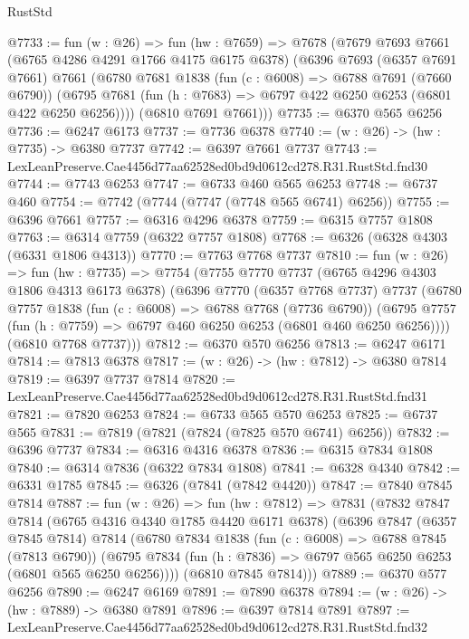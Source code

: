 \begin{lexlean}{RustStd}
\begin{coremodule}
@7733 := fun (w : @26) =>
  fun (hw : @7659) =>
  @7678
    (@7679
      @7693
      @7661
      (@6765 @4286 @4291 @1766 @4175 @6175 @6378)
      (@6396
        @7693
        (@6357 @7691 @7661)
        @7661
        (@6780
          @7681
          @1838
          (fun (c : @6008) => @6788 @7691 (@7660 @6790))
          (@6795 @7681 (fun (h : @7683) => @6797 @422 @6250 @6253 (@6801 @422 @6250 @6256))))
        (@6810 @7691 @7661)))
@7735 := @6370 @565 @6256
@7736 := @6247 @6173
@7737 := @7736 @6378
@7740 := (w : @26) -> (hw : @7735) -> @6380 @7737
@7742 := @6397 @7661 @7737
@7743 := LexLeanPreserve.Cae4456d77aa62528ed0bd9d0612cd278.R31.RustStd.fnd30
@7744 := @7743 @6253
@7747 := @6733 @460 @565 @6253
@7748 := @6737 @460
@7754 := @7742 (@7744 (@7747 (@7748 @565 @6741) @6256))
@7755 := @6396 @7661
@7757 := @6316 @4296 @6378
@7759 := @6315 @7757 @1808
@7763 := @6314 @7759 (@6322 @7757 @1808)
@7768 := @6326 (@6328 @4303 (@6331 @1806 @4313))
@7770 := @7763 @7768 @7737
@7810 := fun (w : @26) =>
  fun (hw : @7735) =>
  @7754
    (@7755
      @7770
      @7737
      (@6765 @4296 @4303 @1806 @4313 @6173 @6378)
      (@6396
        @7770
        (@6357 @7768 @7737)
        @7737
        (@6780
          @7757
          @1838
          (fun (c : @6008) => @6788 @7768 (@7736 @6790))
          (@6795 @7757 (fun (h : @7759) => @6797 @460 @6250 @6253 (@6801 @460 @6250 @6256))))
        (@6810 @7768 @7737)))
@7812 := @6370 @570 @6256
@7813 := @6247 @6171
@7814 := @7813 @6378
@7817 := (w : @26) -> (hw : @7812) -> @6380 @7814
@7819 := @6397 @7737 @7814
@7820 := LexLeanPreserve.Cae4456d77aa62528ed0bd9d0612cd278.R31.RustStd.fnd31
@7821 := @7820 @6253
@7824 := @6733 @565 @570 @6253
@7825 := @6737 @565
@7831 := @7819 (@7821 (@7824 (@7825 @570 @6741) @6256))
@7832 := @6396 @7737
@7834 := @6316 @4316 @6378
@7836 := @6315 @7834 @1808
@7840 := @6314 @7836 (@6322 @7834 @1808)
@7841 := @6328 @4340
@7842 := @6331 @1785
@7845 := @6326 (@7841 (@7842 @4420))
@7847 := @7840 @7845 @7814
@7887 := fun (w : @26) =>
  fun (hw : @7812) =>
  @7831
    (@7832
      @7847
      @7814
      (@6765 @4316 @4340 @1785 @4420 @6171 @6378)
      (@6396
        @7847
        (@6357 @7845 @7814)
        @7814
        (@6780
          @7834
          @1838
          (fun (c : @6008) => @6788 @7845 (@7813 @6790))
          (@6795 @7834 (fun (h : @7836) => @6797 @565 @6250 @6253 (@6801 @565 @6250 @6256))))
        (@6810 @7845 @7814)))
@7889 := @6370 @577 @6256
@7890 := @6247 @6169
@7891 := @7890 @6378
@7894 := (w : @26) -> (hw : @7889) -> @6380 @7891
@7896 := @6397 @7814 @7891
@7897 := LexLeanPreserve.Cae4456d77aa62528ed0bd9d0612cd278.R31.RustStd.fnd32

\end{coremodule}
\end{lexlean}
